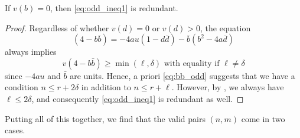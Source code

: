 \begin{lemma}
  If $v(b) = 0$, then \eqref{eq:odd_ineq1} is redundant.
\end{lemma}
\begin{proof}
  Regardless of whether $v(d) = 0$ or $v(d) > 0$, the equation
  \[ (4-b \bar b) = -4au(1-d\bar d) - \bar b(b^2-4a\bar d) \]
  always implies
  \begin{equation}
    v(4-b\bar b) \ge \min(\ell,\delta) \text{ with equality if } \ell \neq \delta
    \label{eq:bb_odd}
  \end{equation}
  sinec $-4au$ and $\bar b$ are units.
  Hence, a priori \eqref{eq:bb_odd} suggests that we have a condition
  $n \le r + 2 \delta$ in addition to $n \le r + \ell$.
  However, by , we always have $\ell \le 2 \delta$,
  and consequently \eqref{eq:odd_ineq1} is redundant as well.
\end{proof}

Putting all of this together, we find that the valid pairs $(n,m)$ come in two cases.

